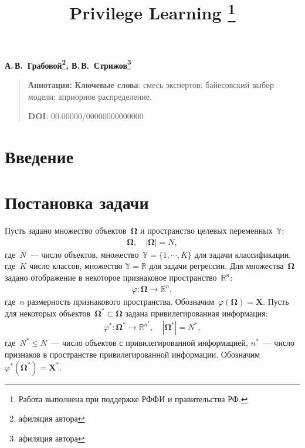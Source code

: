 \documentclass[12pt, twoside]{article}
\numberwithin{equation}{section}
\begin{document}
\title{\bf Privilege Learning \thanks{Работа выполнена при поддержке РФФИ и правительства РФ.}}
\date{}
\author{}
\maketitle

\begin{center}
\bf
А.\,В.~Грабовой\footnote{афиляция автора}, В.\,В.~Стрижов\footnote{афиляция автора}

\end{center}

{\centering\begin{quote}
\textbf{Аннотация:} 
\smallskip
\textbf{Ключевые слова}: смесь экспертов; байесовский выбор модели; априорное распределение.

\smallskip
\textbf{DOI}: 00.00000/00000000000000
\end{quote}
}

\section{Введение}
\section{Постановка задачи}
Пусть задано множество объектов~$\bm{\Omega}$ и пространство целевых переменных~$\mathbb{Y}$:
\[
\label{eq:st:1}
\begin{aligned}
\bm{\Omega}, \quad \left|\bm{\Omega}\right| = N,
\end{aligned}
\]
где~$N$~--- число объектов, множество~$\mathbb{Y}=\{1,\cdots,K\}$ для задачи классификации, где~$K$ число классов, множество $\mathbb{Y}=\mathbb{R}$ для задачи регрессии.
Для множества~$\bm{\Omega}$ задано отображение в некоторое признаковое пространство~$\mathbb{R}^{n}$:
\[
\label{eq:st:phi}
\begin{aligned}
\varphi:\bm{\Omega} \to \mathbb{R}^{n},
\end{aligned}
\]
где~$n$ размерность признакового пространства. Обозначим~$\varphi(\bm{\Omega}) = \textbf{X}$.
Пусть для некоторых объектов~$\bm{\Omega}^* \subset \bm{\Omega}$ задана привилегированная информация:
\[
\label{eq:st:phi*}
\begin{aligned}
\varphi^*:\bm{\Omega}^* \to \mathbb{R}^{n^*}, \quad \left|\bm{\Omega}^*\right| = N^*,
\end{aligned}
\]
где~$N^* \leq N$~--- число объектов с привилегированной информацией, $n^*$~--- число признаков в пространстве привилегированной информации. Обозначим~$\varphi^*(\bm{\Omega}^*) = \textbf{X}^*$.
\end{document}
